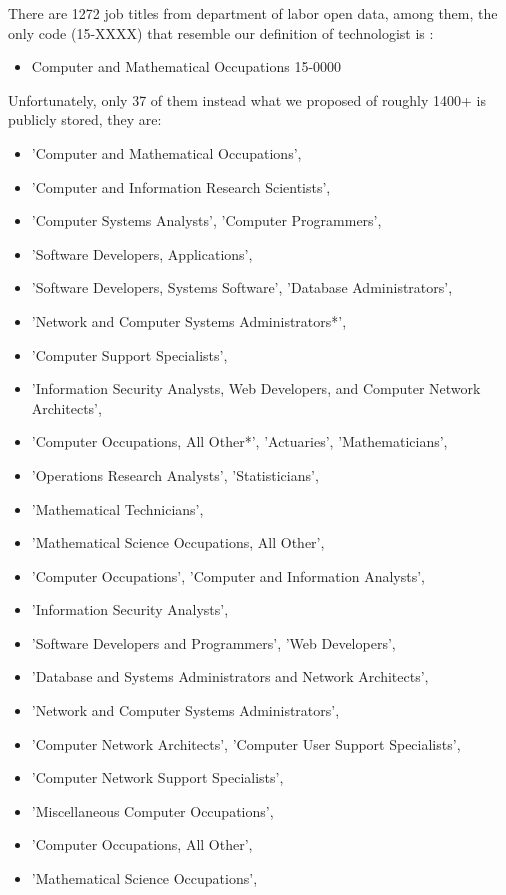 There are 1272 job titles from department of labor open data, among  them, the only code (15-XXXX) that resemble our definition of technologist  is : 
\begin{itemize}
	\item Computer and Mathematical Occupations 15-0000
\end{itemize}
Unfortunately, only 37 of them instead  what we proposed of roughly 1400+ is publicly stored, they are:\\
{ \small
\begin{itemize}
	\item 'Computer and Mathematical Occupations',
	\item	'Computer and Information Research Scientists',
	\item	'Computer Systems Analysts', 'Computer Programmers',
	\item	'Software Developers, Applications',
	\item	'Software Developers, Systems Software', 'Database Administrators',
	\item	'Network and Computer Systems Administrators*',
	\item	'Computer Support Specialists',
	\item	'Information Security Analysts, Web Developers, and Computer Network Architects',
	\item	'Computer Occupations, All Other*', 'Actuaries', 'Mathematicians',
	\item	'Operations Research Analysts', 'Statisticians',
	\item	'Mathematical Technicians',
	\item	'Mathematical Science Occupations, All Other',
	\item	'Computer Occupations', 'Computer and Information Analysts',
	\item	'Information Security Analysts',
	\item	'Software Developers and Programmers', 'Web Developers',
	\item	'Database and Systems Administrators and Network Architects',
	\item	'Network and Computer Systems Administrators',
	\item	'Computer Network Architects', 'Computer User Support Specialists',
	\item	'Computer Network Support Specialists',
	\item	'Miscellaneous Computer Occupations',
	\item	'Computer Occupations, All Other',
	\item	'Mathematical Science Occupations',

\end{itemize}}
